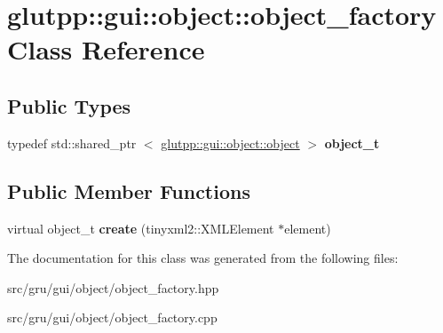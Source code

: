 \hypertarget{classglutpp_1_1gui_1_1object_1_1object__factory}{\section{glutpp\-:\-:gui\-:\-:object\-:\-:object\-\_\-factory \-Class \-Reference}
\label{classglutpp_1_1gui_1_1object_1_1object__factory}
}
\subsection*{\-Public \-Types}
\begin{DoxyCompactItemize}
\item 
\hypertarget{classglutpp_1_1gui_1_1object_1_1object__factory_a4a6e3b986deecc14be3b9f2f15dbd6f2}{typedef std\-::shared\-\_\-ptr\*
$<$ \hyperlink{classglutpp_1_1gui_1_1object_1_1object}{glutpp\-::gui\-::object\-::object} $>$ {\bfseries object\-\_\-t}}\label{classglutpp_1_1gui_1_1object_1_1object__factory_a4a6e3b986deecc14be3b9f2f15dbd6f2}

\end{DoxyCompactItemize}
\subsection*{\-Public \-Member \-Functions}
\begin{DoxyCompactItemize}
\item 
\hypertarget{classglutpp_1_1gui_1_1object_1_1object__factory_ad6b48642d69dfe052d7f705d32e9420e}{virtual object\-\_\-t {\bfseries create} (tinyxml2\-::\-X\-M\-L\-Element $\ast$element)}\label{classglutpp_1_1gui_1_1object_1_1object__factory_ad6b48642d69dfe052d7f705d32e9420e}

\end{DoxyCompactItemize}


\-The documentation for this class was generated from the following files\-:\begin{DoxyCompactItemize}
\item 
src/gru/gui/object/object\-\_\-factory.\-hpp\item 
src/gru/gui/object/object\-\_\-factory.\-cpp\end{DoxyCompactItemize}
